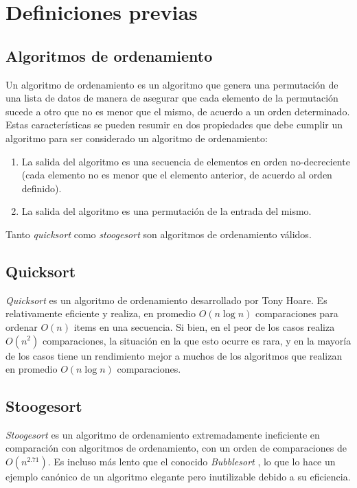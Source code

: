\documentclass[a4paper,11pt]{article}
\begin{document}
\section{Definiciones previas}

\subsection{Algoritmos de ordenamiento}

Un algoritmo de ordenamiento es un algoritmo que genera una permutación de una
lista de datos de manera de asegurar que cada elemento de la permutación sucede
a otro que no es menor que el mismo, de acuerdo a un orden determinado. Estas
características se pueden resumir en dos propiedades que debe cumplir un
algoritmo para ser considerado un algoritmo de ordenamiento:

\begin{enumerate}
  \item La salida del algoritmo es una secuencia de elementos en orden
    no-decreciente (cada elemento no es menor que el elemento anterior, de
    acuerdo al orden definido).

  \item La salida del algoritmo es una permutación de la entrada del mismo.
\end{enumerate}

Tanto \textit{quicksort} como \textit{stoogesort} son algoritmos de
ordenamiento válidos.

\subsection{Quicksort}

\textit{Quicksort} es un algoritmo de ordenamiento desarrollado por Tony Hoare.
Es relativamente eficiente y realiza, en promedio \(O(n\log{n})\) comparaciones
para ordenar \(O(n)\) items en una secuencia. Si bien, en el peor de los casos
realiza \(O(n^2)\) comparaciones, la situación en la que esto ocurre es rara, y
en la mayoría de los casos tiene un rendimiento mejor a muchos de los
algoritmos que realizan en promedio \(O(n\log{n})\) comparaciones.

\subsection{Stoogesort}

\textit{Stoogesort} es un algoritmo de ordenamiento extremadamente ineficiente
en comparación con algoritmos de ordenamiento, con un orden de comparaciones de
\(O(n^{2.71})\). Es incluso más lento que el conocido \textit{Bubblesort}
\cite{WIKIBUB}, lo que lo hace un ejemplo canónico de un algoritmo elegante
pero inutilizable debido a su eficiencia.
\end{document}
